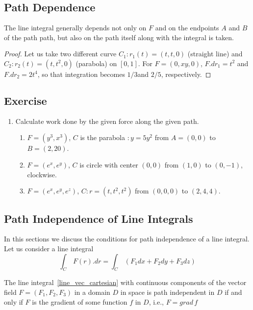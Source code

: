 \documentclass[aima331_lecturenotes_ku.tex]{subfiles}
\begin{document}
\subsection{Path Dependence}
\begin{theorem}
  The line integral generally depends not only on $F$ and on the endpoints $A$ and $B$ of the path path, but also on the path itself along with the integral is taken.
\end{theorem}
\begin{proof}
  Let us take two different curve $C_1: r_1(t)=(t,t,0)$ (straight line)  and $C_2:r_2(t)=(t,t^2,0)$ (parabola) on $[0,1]$. For $F=(0,xy,0)$, $F.dr_1 = t^2$ and $F.dr_2 = 2t^4$, so that integration becomes $1/3$and $2/5$, respectively.
\end{proof}

\subsection{Exercise}
\begin{enumerate}
\item Calculate work done by the given force along the given path.
  \begin{enumerate}
  \item $F=(y^3, x^3)$,  $C$ is the parabola $:y=5y^2$ from $A=(0,0)$ to $B=(2,20)$.
  \item $F=(e^x, e^y)$, $C$ is circle with center $(0,0)$ from $(1,0)$ to $(0,-1)$, clockwise.
 \item $F=(e^x, e^y, e^z)$, $C:r=(t, t^2, t^2)$ from $(0,0,0)$ to $(2,4,4)$.
  \end{enumerate}
\end{enumerate}

\subsection{Path Independence of Line Integrals}
In this sections we discuss the conditions for path independence of a line integral.
Let us consider a line integral
\begin{equation}
  \label{line_vec_cartesian}
  \displaystyle \int_C\, F(r).dr=\int_C\,(F_1dx + F_2dy + F_3dz)
\end{equation}
\begin{theorem}
  The line integral~\ref{line_vec_cartesian} with continuous components of the vector field $F=(F_1, F_2, F_3)$ in a domain $D$ in space is path independent in $D$ if and only if $F$ is the gradient of some function $f$ in $D$, i.e., $F=grad \,f$
\end{theorem}
\end{document}
